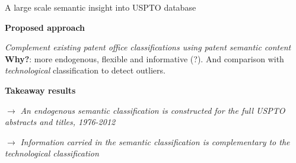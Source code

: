 \documentclass{beamer}
\begin{document}



\begin{frame}{A large scale semantic insight into USPTO database}
    
    
    \textbf{Proposed approach}
    
    \medskip
    
    \textit{Complement existing patent office classifications using patent semantic content} \\
    \textbf{Why?}: more endogenous, flexible and informative (?). And comparison with \emph{technological} classification to detect outliers.
    
    \bigskip
    
    \textbf{Takeaway results}
    
    \medskip
    
    $\rightarrow$ \textit{An endogenous semantic classification is constructed for the full USPTO abstracts and titles, 1976-2012}
    
    \bigskip

    $\rightarrow$ \textit{Information carried in the semantic classification is complementary to the technological classification}
    
    
\end{frame}
\end{document}
